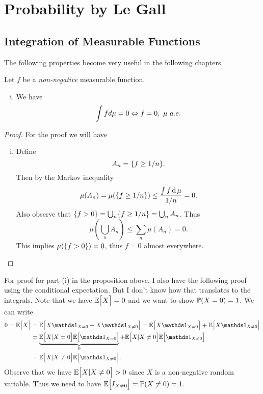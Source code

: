 \chapter{Probability by Le Gall}

\section{Integration of Measurable Functions}

The following properties become very useful in the following chapters. 
\begin{proposition}
	Let $ f $ be a \emph{non-negative} measurable function.
	\begin{enumerate}[(i)]
		\item We have
		\[ \int f d\mu = 0 \Leftrightarrow f = 0,\ \mu\ a.e. \]
	\end{enumerate}
\end{proposition}
\begin{proof}
	For the proof we will have
	\begin{enumerate}[(i)]
		\item Define 
		\[ A_n = \{f \geq 1/n\}. \]
		Then by the Markov inequality
		\[ \mu(A_n) = \mu(\{f \geq 1/n\}) \leq \frac{\int f\operatorname{d}\mu}{1/n} = 0. \]
		Also observe that $ \{f > 0\} = \bigcup_n \{f \geq 1/n\} = \bigcup_n A_n $. Thus
		\[ \mu(\bigcup_n A_n) \leq \sum_n \mu(A_n) = 0. \]
		This implies $ \mu(\{f>0\}) = 0 $, thus $ f = 0 $ almost everywhere.
		
	\end{enumerate}
\end{proof}
\begin{remark}
	For proof for part (i) in the proposition above, I also have the following proof using the conditional expectation. But I don't know how that translates to the integrals. Note that we have $ \mathbb{E}\big[X\big] = 0 $ and we want to show $ \mathbb{P}(X = 0) = 1 $. We can write
	\begin{align*}
		0 = \E{X} &= \E{X\I_{X=0} + X\I_{X\neq 0}} = \E{X\I_{X=0}} + \E{X\I_{X\neq0}} \\
		&= \underbrace{\E{X|X=0}\E{\I_{X=0}}}_{0} + \E{X|X\neq 0} \E{\I_{X\neq 0}} \\
		&= \E{X|X\neq 0} \E{\I_{X\neq 0}}.
	\end{align*}
	Observe that we have $ \mathbb{E}\big[X|X\neq 0\big] > 0 $ since $ X $ is a non-negative random variable. Thus we need to have $ \mathbb{E}\big[I_{X\neq 0}\big] = \mathbb{P}(X\neq0) = 1 $.
\end{remark}


